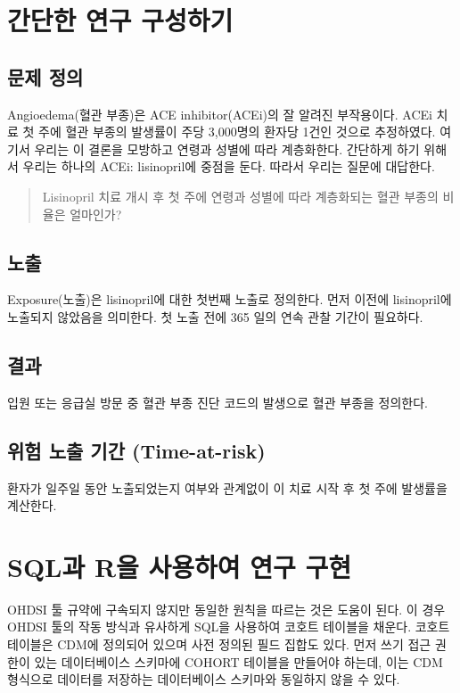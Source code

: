 \documentclass[11pt]{book}
\theoremstyle{definition}
\theoremstyle{definition}
\theoremstyle{definition}
\theoremstyle{remark}
\begin{document}
\section{간단한 연구 구성하기}\label{--}

\subsection{문제 정의}\label{-}

Angioedema(혈관 부종)은 ACE inhibitor(ACEi)의 잘 알려진 부작용이다.
\citep{slater_1988} ACEi 치료 첫 주에 혈관 부종의 발생률이 주당
3,000명의 환자당 1건인 것으로 추정하였다. 여기서 우리는 이 결론을
모방하고 연령과 성별에 따라 계층화한다. 간단하게 하기 위해서 우리는
하나의 ACEi: lisinopril에 중점을 둔다. 따라서 우리는 질문에 대답한다.

\begin{quote}
Lisinopril 치료 개시 후 첫 주에 연령과 성별에 따라 계층화되는 혈관
부종의 비율은 얼마인가?
\end{quote}

\subsection{노출}

Exposure(노출)은 lisinopril에 대한 첫번째 노출로 정의한다. 먼저 이전에
lisinopril에 노출되지 않았음을 의미한다. 첫 노출 전에 365 일의 연속 관찰
기간이 필요하다.

\subsection{결과}

입원 또는 응급실 방문 중 혈관 부종 진단 코드의 발생으로 혈관 부종을
정의한다.

\subsection{위험 노출 기간 (Time-at-risk)}\label{---time-at-risk}

환자가 일주일 동안 노출되었는지 여부와 관계없이 이 치료 시작 후 첫 주에
발생률을 계산한다.

\section{SQL과 R을 사용하여 연구 구현}\label{sql-r---}

OHDSI 툴 규약에 구속되지 않지만 동일한 원칙을 따르는 것은 도움이 된다.
이 경우 OHDSI 툴의 작동 방식과 유사하게 SQL을 사용하여 코호트 테이블을
채운다. 코호트 테이블은 CDM에 정의되어 있으며 사전 정의된 필드 집합도
있다. 먼저 쓰기 접근 권한이 있는 데이터베이스 스키마에 COHORT 테이블을
만들어야 하는데, 이는 CDM 형식으로 데이터를 저장하는 데이터베이스
스키마와 동일하지 않을 수 있다.
\end{document}

